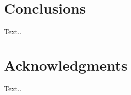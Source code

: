 \documentclass{acm_proc_article-sp}
\begin{document}



\section{Conclusions}
Text..

\section{Acknowledgments}
Text..

%

%
%

\balancecolumns
\end{document}
